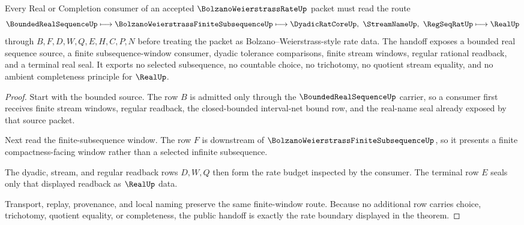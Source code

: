 \begin{theorem}
\label{thm:bolzano-weierstrass-rate-window-handoff}
Every Real or Completion consumer of an accepted $\BolzanoWeierstrassRateUp$ packet must read the route
$$
\BoundedRealSequenceUp
\longmapsto
\BolzanoWeierstrassFiniteSubsequenceUp
\longmapsto
\DyadicRatCoreUp,\ \StreamNameUp,\ \RegSeqRatUp
\longmapsto
\RealUp
$$
through $B,F,D,W,Q,E,H,C,P,N$ before treating the packet as Bolzano--Weierstrass-style rate data. The handoff exposes a bounded real sequence source, a finite subsequence-window consumer, dyadic tolerance comparisons, finite stream windows, regular rational readback, and a terminal real seal. It exports no selected subsequence, no countable choice, no trichotomy, no quotient stream equality, and no ambient completeness principle for $\RealUp$.
\end{theorem}
\begin{proof}
Start with the bounded source. The row $B$ is admitted only through the $\BoundedRealSequenceUp$ carrier, so a consumer first receives finite stream windows, regular readback, the closed-bounded interval-net bound row, and the real-name seal already exposed by that source packet.

Next read the finite-subsequence window. The row $F$ is downstream of $\BolzanoWeierstrassFiniteSubsequenceUp$, so it presents a finite compactness-facing window rather than a selected infinite subsequence.

The dyadic, stream, and regular readback rows $D,W,Q$ then form the rate budget inspected by the consumer. The terminal row $E$ seals only that displayed readback as $\RealUp$ data.

Transport, replay, provenance, and local naming preserve the same finite-window route. Because no additional row carries choice, trichotomy, quotient equality, or completeness, the public handoff is exactly the rate boundary displayed in the theorem.
\end{proof}


